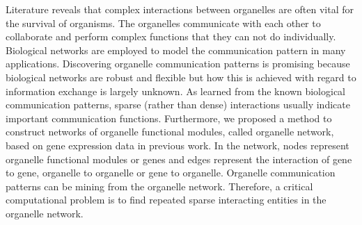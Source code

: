 \documentclass[9pt,oneside]{article}
\begin{document}
 Literature reveals that complex interactions between organelles are often vital for the survival of organisms. The organelles communicate with each other to collaborate and perform complex functions that they can not do individually\cite{agrawal2011plant}. Biological networks are employed to model the communication pattern in many applications\cite{barabasi2004network}. 
%
Discovering organelle communication patterns is promising because biological networks are robust and flexible but how this is achieved with regard to information exchange is largely unknown. As learned from the known biological communication patterns, sparse (rather than dense) interactions usually indicate important communication functions\cite{wong2012biological,bayati2013message}. Furthermore, we proposed a method to construct networks of organelle functional modules, called organelle network, based on gene expression data in previous work\cite{}. In the network, nodes represent organelle functional modules or genes and edges represent the interaction of gene to gene, organelle to organelle or gene to organelle.  
%
Organelle communication patterns can be mining from the organelle network. Therefore, a critical computational problem is to find repeated sparse interacting entities in the organelle network.   
%


%

%
\end{document}
